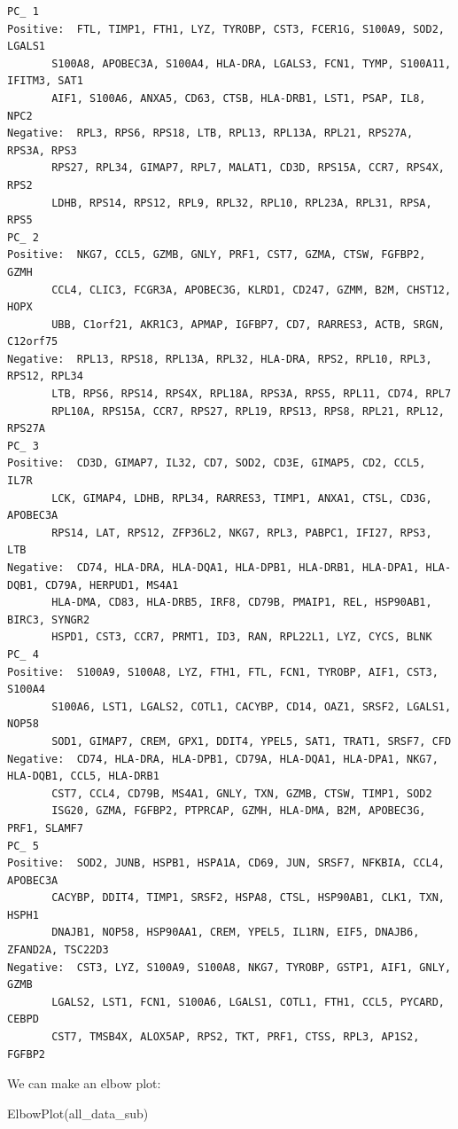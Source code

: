 \documentclass[
  letterpaper,
  DIV=11,
  numbers=noendperiod]{scrreprt}
\newenvironment{Shaded}{\begin{snugshade}}{\end{snugshade}}
\newcommand{\FunctionTok}[1]{\textcolor[rgb]{0.28,0.35,0.67}{#1}}
\newcommand{\NormalTok}[1]{\textcolor[rgb]{0.00,0.23,0.31}{#1}}
\begin{document}
\begin{verbatim}
PC_ 1 
Positive:  FTL, TIMP1, FTH1, LYZ, TYROBP, CST3, FCER1G, S100A9, SOD2, LGALS1 
       S100A8, APOBEC3A, S100A4, HLA-DRA, LGALS3, FCN1, TYMP, S100A11, IFITM3, SAT1 
       AIF1, S100A6, ANXA5, CD63, CTSB, HLA-DRB1, LST1, PSAP, IL8, NPC2 
Negative:  RPL3, RPS6, RPS18, LTB, RPL13, RPL13A, RPL21, RPS27A, RPS3A, RPS3 
       RPS27, RPL34, GIMAP7, RPL7, MALAT1, CD3D, RPS15A, CCR7, RPS4X, RPS2 
       LDHB, RPS14, RPS12, RPL9, RPL32, RPL10, RPL23A, RPL31, RPSA, RPS5 
PC_ 2 
Positive:  NKG7, CCL5, GZMB, GNLY, PRF1, CST7, GZMA, CTSW, FGFBP2, GZMH 
       CCL4, CLIC3, FCGR3A, APOBEC3G, KLRD1, CD247, GZMM, B2M, CHST12, HOPX 
       UBB, C1orf21, AKR1C3, APMAP, IGFBP7, CD7, RARRES3, ACTB, SRGN, C12orf75 
Negative:  RPL13, RPS18, RPL13A, RPL32, HLA-DRA, RPS2, RPL10, RPL3, RPS12, RPL34 
       LTB, RPS6, RPS14, RPS4X, RPL18A, RPS3A, RPS5, RPL11, CD74, RPL7 
       RPL10A, RPS15A, CCR7, RPS27, RPL19, RPS13, RPS8, RPL21, RPL12, RPS27A 
PC_ 3 
Positive:  CD3D, GIMAP7, IL32, CD7, SOD2, CD3E, GIMAP5, CD2, CCL5, IL7R 
       LCK, GIMAP4, LDHB, RPL34, RARRES3, TIMP1, ANXA1, CTSL, CD3G, APOBEC3A 
       RPS14, LAT, RPS12, ZFP36L2, NKG7, RPL3, PABPC1, IFI27, RPS3, LTB 
Negative:  CD74, HLA-DRA, HLA-DQA1, HLA-DPB1, HLA-DRB1, HLA-DPA1, HLA-DQB1, CD79A, HERPUD1, MS4A1 
       HLA-DMA, CD83, HLA-DRB5, IRF8, CD79B, PMAIP1, REL, HSP90AB1, BIRC3, SYNGR2 
       HSPD1, CST3, CCR7, PRMT1, ID3, RAN, RPL22L1, LYZ, CYCS, BLNK 
PC_ 4 
Positive:  S100A9, S100A8, LYZ, FTH1, FTL, FCN1, TYROBP, AIF1, CST3, S100A4 
       S100A6, LST1, LGALS2, COTL1, CACYBP, CD14, OAZ1, SRSF2, LGALS1, NOP58 
       SOD1, GIMAP7, CREM, GPX1, DDIT4, YPEL5, SAT1, TRAT1, SRSF7, CFD 
Negative:  CD74, HLA-DRA, HLA-DPB1, CD79A, HLA-DQA1, HLA-DPA1, NKG7, HLA-DQB1, CCL5, HLA-DRB1 
       CST7, CCL4, CD79B, MS4A1, GNLY, TXN, GZMB, CTSW, TIMP1, SOD2 
       ISG20, GZMA, FGFBP2, PTPRCAP, GZMH, HLA-DMA, B2M, APOBEC3G, PRF1, SLAMF7 
PC_ 5 
Positive:  SOD2, JUNB, HSPB1, HSPA1A, CD69, JUN, SRSF7, NFKBIA, CCL4, APOBEC3A 
       CACYBP, DDIT4, TIMP1, SRSF2, HSPA8, CTSL, HSP90AB1, CLK1, TXN, HSPH1 
       DNAJB1, NOP58, HSP90AA1, CREM, YPEL5, IL1RN, EIF5, DNAJB6, ZFAND2A, TSC22D3 
Negative:  CST3, LYZ, S100A9, S100A8, NKG7, TYROBP, GSTP1, AIF1, GNLY, GZMB 
       LGALS2, LST1, FCN1, S100A6, LGALS1, COTL1, FTH1, CCL5, PYCARD, CEBPD 
       CST7, TMSB4X, ALOX5AP, RPS2, TKT, PRF1, CTSS, RPL3, AP1S2, FGFBP2 
\end{verbatim}

We can make an elbow plot:

\begin{Shaded}
\begin{Highlighting}[]
\FunctionTok{ElbowPlot}\NormalTok{(all\_data\_sub)}
\end{Highlighting}
\end{Shaded}
\end{document}
